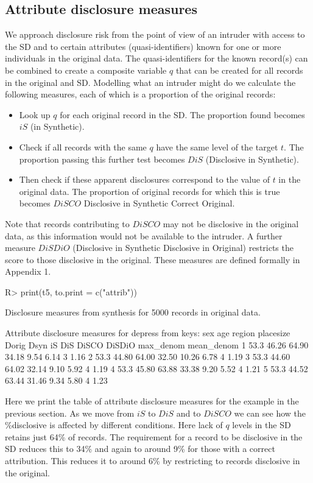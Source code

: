 \documentclass[12pt]{article}
\renewcommand{\baselinestretch}{1.5} %
\begin{document}
\subsection{Attribute disclosure measures}\label{subsec:attrib} 
We approach disclosure risk from the point of view of an intruder with access to the SD
and to certain attributes (quasi-identifiers) known for one or more individuals in the original data.
The quasi-identifiers for the known record(s) can be combined to create a composite variable $q$ that can be created for all records in the original and SD.
Modelling what an intruder might do we calculate the following measures, each of which is a proportion of the original records:
\begin{itemize}
\item{Look up $q$ for each original record in the SD. The proportion found becomes $iS$ (in Synthetic).}
\item{Check if all records with the same $q$ have the same level of the target $t$. The proportion passing this further test becomes $DiS$ (Disclosive in Synthetic).}
\item{Then check if these apparent disclosures correspond to the value of $t$ in the original data. The proportion of original records for which this is true
becomes $DiSCO$ Disclosive in Synthetic Correct Original.}
\end{itemize}
Note that records contributing to $DiSCO$ may not be disclosive in the original data, as this information would not be available to the intruder. A further measure $DiSDiO$ (Disclosive in Synthetic Disclosive in Original) restricts the score to those disclosive in the original. These measures are defined formally in Appendix 1.
\renewcommand{\baselinestretch}{1.0}
\begin{Schunk}
\begin{Sinput}
R> print(t5, to.print = c("attrib"))
\end{Sinput}
\begin{Soutput}
Disclosure measures from synthesis for 5000 records in original data.

Attribute disclosure measures for depress from keys: sex age region placesize 
  Dorig  Dsyn    iS   DiS DiSCO DiSDiO max_denom mean_denom
1  53.3 46.26 64.90 34.18  9.54   6.14         3       1.16
2  53.3 44.80 64.00 32.50 10.26   6.78         4       1.19
3  53.3 44.60 64.02 32.14  9.10   5.92         4       1.19
4  53.3 45.80 63.88 33.38  9.20   5.52         4       1.21
5  53.3 44.52 63.44 31.46  9.34   5.80         4       1.23
\end{Soutput}
\end{Schunk}
\renewcommand{\baselinestretch}{1.5}
Here we print the table of attribute disclosure measures for the example 
in the previous section.
As we move from $iS$ to $DiS$ and to $DiSCO$  we can see how the \%disclosive is affected by different conditions. Here lack of $q$ levels in the SD retains just 64\% of records. The requirement for a record to be disclosive in
the SD reduces this to 34\% and again to around 9\% for those with a correct attribution. This reduces it to around 6\% by restricting to 
records disclosive in the original.
\end{document}
